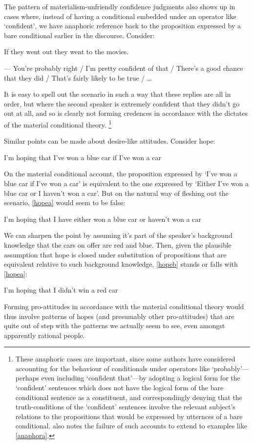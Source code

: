 \documentclass[If.tex]{subfiles}
\begin{document}
The pattern of materialism-unfriendly confidence judgments also shows up in cases where, instead of having a conditional embedded under an operator like ‘confident’, we have anaphoric reference back to the proposition expressed by a bare conditional earlier in the discourse.  Consider:
\begin{prop}
	\nitem \label{anaphora}
	If they went out they went to the movies.  
	
	--- You're probably right / I'm pretty confident of that / There's a good chance that they did / That's fairly likely to be true / … %
\end{prop}
It is easy to spell out the scenario in such a way that these replies are all in order, but where the second speaker is extremely confident that they didn't go out at all, and so is clearly not forming credences in accordance with the dictates of the material conditional theory.%
\footnote{These anaphoric cases are important, since some authors \citep{KratzerConditionals,RothschildNCR} have considered accounting for the behaviour of conditionals under operators like ‘probably’---perhaps even including ‘confident that’---by adopting a logical form for the ‘confident’ sentences which does not have the logical form of the bare conditional sentence as a constituent, and correspondingly denying that the truth-conditions of the ‘confident’ sentences involve the relevant subject's relations to the propositions that would be expressed by utternces of a bare conditional.  \citet{vonFintelIf, vonFintelConditionals} also notes the failure of such accounts to extend to examples like \ref{anaphora}.}  

Similar points can be made about desire-like attitudes.  Consider hope:
\begin{prop}
	\nitem \label{hopeblue}
	I'm hoping that I've won a blue car if I've won a car
\end{prop}
On the material conditional account, the proposition expressed by ‘I've won a blue car if I've won a car’ is equivalent to the one expressed by ‘Either I've won a blue car or I haven't won a car’.  But on the natural way of fleshing out the scenario, \ref{hopea} would seem to be false:
\begin{prop}
	\nitem \label{hopea}
	I'm hoping that I have either won a blue car or haven't won a car	
\end{prop}

	We can sharpen the point by assuming it's part of the speaker's background knowledge that the cars on offer are red and blue.  Then, given the plausible assumption that hope is closed under substitution of propositions that are equivalent relative to such background knowledge, \ref{hopeb} stands or falls with \ref{hopea}:
	\begin{prop}
		\nitem \label{hopeb}
		I'm hoping that I didn't win a red car
	\end{prop}
	Forming pro-attitudes in accordance with the material conditional theory would thus involve patterns of hopes (and presumably other pro-attitudes) that are quite out of step with the patterns we actually seem to see, even amongst apparently rational people.  
\end{document}
